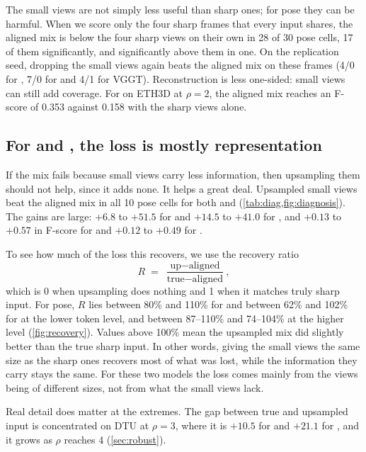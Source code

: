 The small views are not simply less useful than sharp ones; for pose they can be harmful. When we score only the four sharp frames that every input shares, the aligned mix is below the four sharp views on their own in 28 of 30 pose cells, 17 of them significantly, and significantly above them in one. On the replication seed, dropping the small views again beats the aligned mix on these frames (4/0 for \pithree, 7/0 for \dathree and 4/1 for VGGT). Reconstruction is less one-sided: small views can still add coverage. For \pithree on ETH3D at $\rho{=}2$, the aligned mix reaches an F-score of 0.353 against 0.158 with the sharp views alone.

\subsection{For \pithree and \dathree, the loss is mostly representation}

If the mix fails because small views carry less information, then upsampling them should not help, since it adds none. It helps a great deal. Upsampled small views beat the aligned mix in all 10 pose cells for both \pithree and \dathree (\cref{tab:diag,fig:diagnosis}). The gains are large: $+6.8$ to $+51.5$ \auc for \pithree and $+14.5$ to $+41.0$ for \dathree, and $+0.13$ to $+0.57$ in F-score for \pithree and $+0.12$ to $+0.49$ for \dathree.

To see how much of the loss this recovers, we use the recovery ratio
\begin{equation}
  R \;=\; \frac{\text{up} - \text{aligned}}{\text{true} - \text{aligned}},
  \label{eq:recovery}
\end{equation}
which is 0 when upsampling does nothing and 1 when it matches truly sharp input. For pose, $R$ lies between 80\% and 110\% for \pithree and between 62\% and 102\% for \dathree at the lower token level, and between 87--110\% and 74--104\% at the higher level (\cref{fig:recovery}). Values above 100\% mean the upsampled mix did slightly better than the true sharp input. In other words, giving the small views the same size as the sharp ones recovers most of what was lost, while the information they carry stays the same. For these two models the loss comes mainly from the views being of different sizes, not from what the small views lack.

Real detail does matter at the extremes. The gap between true and upsampled input is concentrated on DTU at $\rho{=}3$, where it is $+10.5$ \auc for \pithree and $+21.1$ for \dathree, and it grows as $\rho$ reaches 4 (\cref{sec:robust}).

